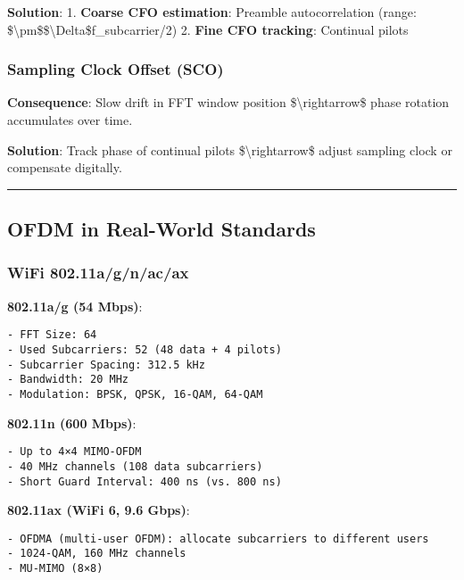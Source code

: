 \textbf{Solution}: 1. \textbf{Coarse CFO estimation}: Preamble
autocorrelation (range:
\$\textbackslash pm\$\$\textbackslash Delta\$f\_subcarrier/2) 2.
\textbf{Fine CFO tracking}: Continual pilots

\subsubsection{Sampling Clock Offset
(SCO)}\label{sampling-clock-offset-sco}

\textbf{Consequence}: Slow drift in FFT window position
\$\textbackslash rightarrow\$ phase rotation accumulates over time.

\textbf{Solution}: Track phase of continual pilots
\$\textbackslash rightarrow\$ adjust sampling clock or compensate
digitally.

\begin{center}\rule{0.5\linewidth}{0.5pt}\end{center}

\subsection{\texorpdfstring{ OFDM in Real-World
Standards}{ OFDM in Real-World Standards}}\label{ofdm-in-real-world-standards}

\subsubsection{WiFi 802.11a/g/n/ac/ax}\label{wifi-802.11agnacax}

\textbf{802.11a/g (54 Mbps)}:

\begin{verbatim}
- FFT Size: 64
- Used Subcarriers: 52 (48 data + 4 pilots)
- Subcarrier Spacing: 312.5 kHz
- Bandwidth: 20 MHz
- Modulation: BPSK, QPSK, 16-QAM, 64-QAM
\end{verbatim}

\textbf{802.11n (600 Mbps)}:

\begin{verbatim}
- Up to 4×4 MIMO-OFDM
- 40 MHz channels (108 data subcarriers)
- Short Guard Interval: 400 ns (vs. 800 ns)
\end{verbatim}

\textbf{802.11ax (WiFi 6, 9.6 Gbps)}:

\begin{verbatim}
- OFDMA (multi-user OFDM): allocate subcarriers to different users
- 1024-QAM, 160 MHz channels
- MU-MIMO (8×8)
\end{verbatim}

